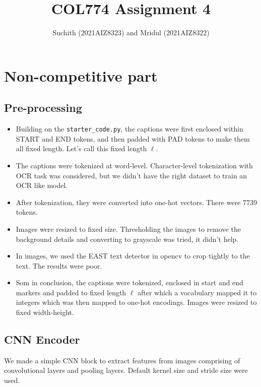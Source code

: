 \documentclass[11pt]{article}
\author{Suchith (2021AIZ8323) and Mridul (2021AIZ8322)}
\date{}
\title{COL774 Assignment 4}
\begin{document}
\maketitle
\setcounter{section}{1}
\section{Non-competitive part}
\label{sec-1}
\subsection{Pre-processing}
\label{sec-1-1}
\begin{itemize}
\item Building on the \texttt{starter\_code.py}, the captions were first
enclosed within START and END tokens, and then padded with PAD
tokens to make them all fixed length. Let's call this fixed length \(\ell\label{ell}\).
\item The captions were tokenized at word-level. Character-level
tokenization with OCR task was considered, but we didn't have the
right dataset to train an OCR like model.
\item After tokenization, they were converted into one-hot vectors. There
were 7739 tokens.
\item Images were resized to fixed size. Thresholding the images to remove
the background details and converting to grayscale was tried, it
didn't help.
\item In images, we used the EAST text detector in opencv to crop tightly
to the text. The results were poor.
\item Som in conclusion, the captions were tokenized, enclosed in start
and end markers and padded to fixed length \(\ell\) after which a vocabulary
mapped it to integers which was then mapped to one-hot
encodings. Images were resized to fixed width-height.
\end{itemize}
\subsection{CNN Encoder}
\label{sec-1-2}
We made a simple CNN block to extract features from images
comprising of convolutional layers and pooling layers. Default kernel
size and stride size were used.
\end{document}
